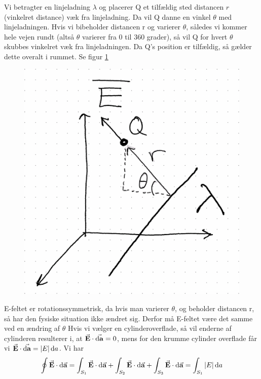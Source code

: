 \documentclass[crop=false, class=memoir]{standalone}
\begin{document}
\begin{opgave}
    \opg
    Vi betragter en linjeladning $\lambda$ og placerer Q et tilfældig sted distancen $r$ (vinkelret distance) væk fra linjeladning. Da vil Q danne en vinkel $\theta$ med linjeladningen. Hvis vi bibeholder distancen r og varierer $\theta$, således vi kommer hele vejen rundt (altså $\theta$ varierer fra 0 til 360 grader), så vil Q for hvert $\theta$ skubbes vinkelret væk fra linjeladningen. Da Q's position er tilfældig, så gælder dette overalt i rummet. Se figur \ref{em:opg:4,6}
    \begin{figure}
        \centering
        \includegraphics[scale=0.3]{Elektro/Elekfig/4.6.png}
        \caption{}
        \label{em:opg:4,6}
    \end{figure}
    \opg
    E-feltet er rotationssymmetrisk, da hvis man varierer $\theta$, og beholder distancen r, så har den fysiske situation ikke ændret sig. Derfor må E-feltet være det samme ved en ændring af $\theta$
    \opg
    Hvis vi vælger en cylinderoverflade, så vil enderne af cylinderen resulterer i, at $\va{E}\cdot\va{\dd{a}}=0$, mens for den krumme cylinder overflade får vi $\va{E}\cdot\va{\dd{a}}=|E|\dd{a}$.
    \opg
    Vi har
    \begin{align*}
        \oint \va E \cdot \dd{\va a} = \int_{S_1} \va E \cdot \dd{\va a} + \int_{S_2} \va E \cdot \dd{\va a} + \int_{S_3} \va E \cdot \dd{\va a}=\int_{S_1}|E|\dd{a}

\end{align*}
\end{opgave}
\end{document}
